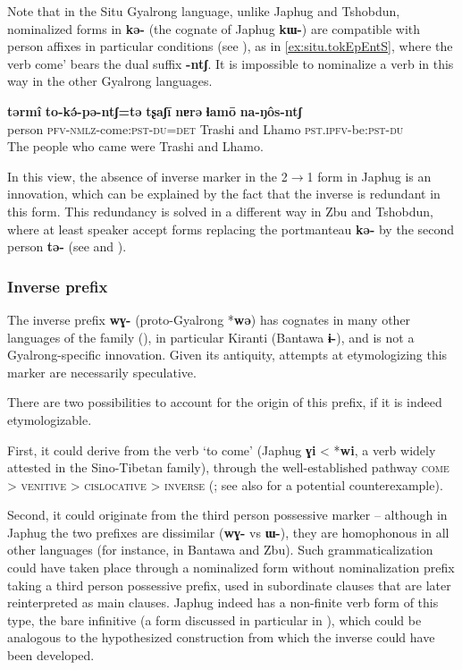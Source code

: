 \documentclass[oldfontcommands,oneside,a4paper,11pt]{article}
\newcommand{\ipa}[1]{\mbox{\phon\textbf{#1}}} %
\begin{document}
Note that in the Situ Gyalrong language, unlike Japhug and Tshobdun, nominalized forms in \ipa{kə-} (the cognate of Japhug \ipa{kɯ-}) are compatible with person affixes in particular conditions (see \citealt[11-12]{jacksonlin07}), as in \ref{ex:situ.tokEpEntS}, where the verb  come' bears the dual suffix \ipa{-ntʃ}. It is impossible to nominalize a verb in this way in the other Gyalrong languages.

 \begin{exe}
\ex \label{ex:situ.tokEpEntS}
\gll
\ipa{tərmî}  	\ipa{to-kə́-pə-ntʃ=tə}  	\ipa{tʂaʃī}  	\ipa{nɐrə}  	\ipa{ɬamō}  	\ipa{na-ŋôs-ntʃ}  	\\
person \textsc{pfv-nmlz}-come:\textsc{pst}-\textsc{du=det} Trashi and Lhamo \textsc{pst.ipfv}-be:\textsc{pst}-\textsc{du} \\
\glt The people who came were Trashi and Lhamo.
  \end{exe}

In this view, the absence of inverse marker in the  2$\rightarrow$1 form in Japhug is an innovation, which can be explained by the fact that the inverse is redundant in this form. This redundancy is solved in a different way in Zbu and Tshobdun, where at least speaker accept forms replacing the portmanteau \ipa{kə-} by the second person \ipa{tə-} (see \citealt{jackson02rentongdengdi} and \citealt{gongxun14agreement}).



 \subsubsection{Inverse prefix}
The inverse prefix \ipa{wɣ-} (proto-Gyalrong *\ipa{wə}) has cognates in many other languages of the family (\citealt{jacques12agreement}), in particular Kiranti (Bantawa \ipa{ɨ-}), and is not a Gyalrong-specific innovation. Given its antiquity, attempts at etymologizing this marker are necessarily speculative. 

There are two possibilities to account for the origin of this prefix, if it is indeed etymologizable. 

First, it could derive from the verb `to come' (Japhug \ipa{ɣi} < *\ipa{wi}, a verb widely attested in the Sino-Tibetan family), through the well-established pathway \textsc{come} > \textsc{venitive} > \textsc{cislocative} > \textsc{inverse} (\citealt{jacques14inverse}; see also \citealt{konnerth15cisloc} for a potential counterexample).

Second, it could originate from the third person possessive marker -- although in Japhug the two prefixes are dissimilar (\ipa{wɣ-} vs \ipa{ɯ-}), they are homophonous in all other languages (for instance, in Bantawa and Zbu). Such grammaticalization could have taken place through a nominalized form without nominalization prefix taking a third person possessive prefix, used in subordinate clauses that are later reinterpreted as main clauses.  Japhug indeed has a non-finite verb form of this type, the bare infinitive (a form discussed in particular in \citealt{jacques14antipassive}), which could be analogous to the hypothesized construction from which the inverse could have been developed.
\end{document}
